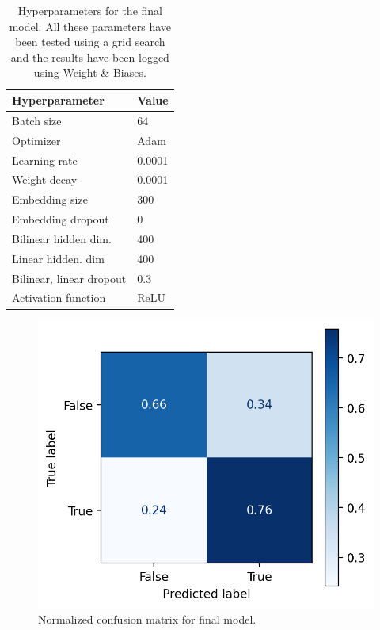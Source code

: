 \documentclass[11pt,a4paper]{article}
\begin{document}
	\begin{table}[H]
		\centering
		\begin{tabular}{@{}ll@{}}
			\toprule
			\textbf{Hyperparameter}  & \textbf{Value} \\ \midrule
			Batch size               & 64             \\
			Optimizer                & Adam           \\
			Learning rate            & 0.0001         \\
			Weight decay             & 0.0001         \\
			Embedding size           & 300            \\
			Embedding dropout        & 0              \\
			Bilinear hidden dim.     & 400            \\
			Linear hidden. dim       & 400            \\
			Bilinear, linear dropout & 0.3            \\
			Activation function      & ReLU           \\ \bottomrule
		\end{tabular}
		\caption{Hyperparameters for the final model. All these parameters have been tested using a grid search and the results have been logged using Weight \& Biases.}
		\label{tab:hyperparameters}
	\end{table}
	
	\begin{figure}[H]
		\centering
		\includegraphics[width=1\columnwidth]{confusion_matrix.png}
		\caption{Normalized confusion matrix for final model.}
		\label{fig:confusionmatrix}
	\end{figure}
	
	
	
	
	
	
\end{document}
